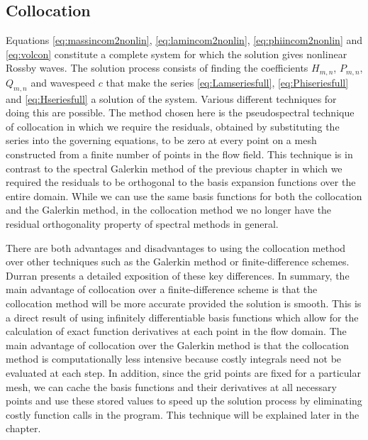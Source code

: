\subsection{Collocation}
Equations \eqref{eq:massincom2nonlin}, \eqref{eq:lamincom2nonlin}, \eqref{eq:phiincom2nonlin} and \eqref{eq:volcon} constitute a complete system for which the solution gives nonlinear Rossby waves. The solution process consists of finding the coefficients $H_{m,n}$, $P_{m,n}$, $Q_{m,n}$ and wavespeed $c$ that make the series \eqref{eq:Lamseriesfull}, \eqref{eq:Phiseriesfull} and \eqref{eq:Hseriesfull} a solution of the system. Various different techniques for doing this are possible. The method chosen here is the pseudospectral technique of collocation in which we require the residuals, obtained by substituting the series into the governing equations, to be zero at every point on a mesh constructed from a finite number of points in the flow field. This technique is in contrast to the spectral Galerkin method of the previous chapter in which we required the residuals to be orthogonal to the basis expansion functions over the entire domain. While we can use the same basis functions for both the collocation and the Galerkin method, in the collocation method we no longer have the residual orthogonality property of spectral methods in general.

There are both advantages and disadvantages to using the collocation method over other techniques such as the Galerkin method or finite-difference schemes. Durran\cite[pages 191--195]{Duran:NMW} presents a detailed exposition of these key differences. In summary, the main advantage of collocation over a finite-difference scheme is that the collocation method will be more accurate provided the solution is smooth. This is a direct result of using infinitely differentiable basis functions which allow for the calculation of exact function derivatives at each point in the flow domain. The main advantage of collocation over the Galerkin method is that the collocation method is computationally less intensive because costly integrals need not be evaluated at each step. In addition, since the grid points are fixed for a particular mesh, we can cache the basis functions and their derivatives at all necessary points and use these stored values to speed up the solution process by eliminating costly function calls in the program. This technique will be explained later in the chapter.

